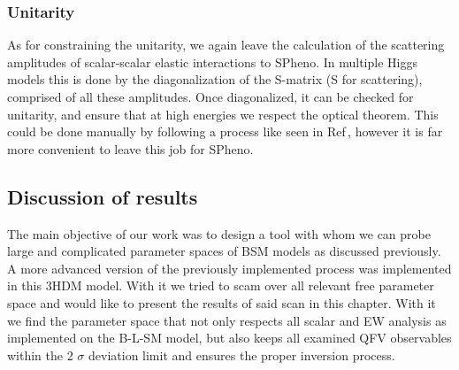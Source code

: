 \subsubsection{Unitarity}

As for constraining the unitarity, we again leave the calculation of the scattering amplitudes of scalar-scalar elastic interactions to SPheno. 
%
In multiple Higgs models this is done by the diagonalization of the S-matrix (S for scattering), comprised of all these amplitudes.
%
Once diagonalized, it can be checked for unitarity, and ensure that at high energies we respect the optical theorem.  
%
This could be done manually by following a process like seen in Ref\,\cite{Moretti_2015}, however it is far more convenient to leave this job for SPheno. 

% 

%

\subsection{Discussion of results}

The main objective of our work was to design a tool with whom we can probe large and complicated parameter spaces of BSM models as discussed previously. 
%
A more advanced version of the previously implemented process was implemented in this 3HDM model.
%
With it we tried to scam over all relevant free parameter space and would like to present the results of said scan in this chapter. 
%
%
With it we find the parameter space that not only respects all scalar and EW analysis as implemented on the B-L-SM model, but also keeps all examined QFV observables within the 2 $\sigma$ deviation limit and ensures the proper inversion process. 

